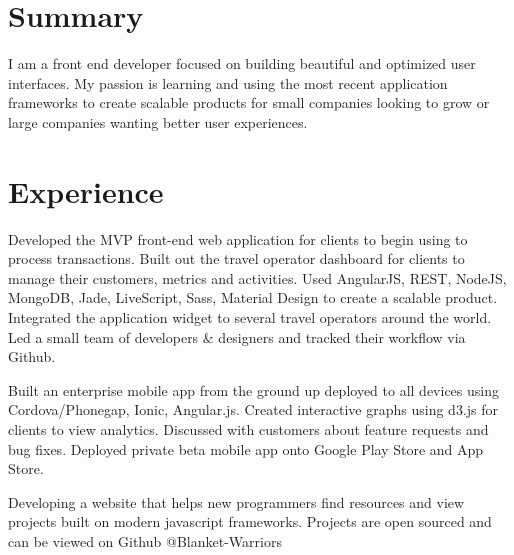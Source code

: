 \documentclass[]{deedy-resume-openfont}
\begin{document}
\hfill
\begin{minipage}[t]{0.64\textwidth} 


\section{Summary}
I am a front end developer focused on building beautiful and optimized user interfaces. My passion is learning and using the most recent application frameworks to create scalable products for small companies looking to grow or large companies wanting better user experiences.
\sectionsep


\section{Experience}

\vspace{\topsep}
Developed the MVP front-end web application for clients to begin using to process transactions.
Built out the travel operator dashboard for clients to manage their customers, metrics and activities.
Used AngularJS, REST, NodeJS, MongoDB, Jade, LiveScript, Sass, Material Design to create a scalable product. Integrated the application widget to several travel operators around the world. Led a small team of developers \& designers and tracked their workflow via Github.
\sectionsep

\vspace{\topsep} %
Built an enterprise mobile app from the ground up deployed to all devices using Cordova/Phonegap, Ionic, Angular.js. Created interactive graphs using d3.js for clients to view analytics. Discussed with customers about feature requests and bug fixes. Deployed private beta mobile app onto Google Play Store and App Store.
\sectionsep

\vspace{\topsep} %
Developing a website that helps new programmers find resources and view projects built on modern javascript frameworks. Projects are open sourced and can be viewed on Github @Blanket-Warriors\sectionsep


\end{minipage}
\end{document}
